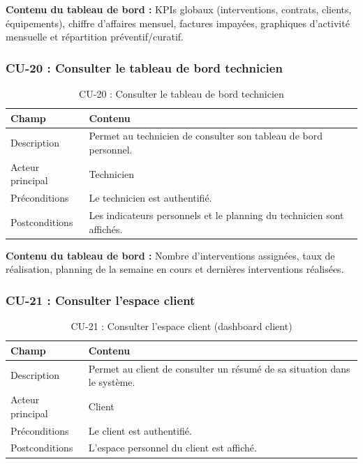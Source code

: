 \textbf{Contenu du tableau de bord :} KPIs globaux (interventions, contrats, clients, équipements), chiffre d'affaires mensuel, factures impayées, graphiques d'activité mensuelle et répartition préventif/curatif.

\subsubsection{CU-20 : Consulter le tableau de bord technicien}

\begin{table}[H]
\centering
\caption{CU-20 : Consulter le tableau de bord technicien}
\label{tab:ch5:cu20}
\begin{tabular}{|p{3.5cm}|p{11cm}|}
\hline
\textbf{Champ} & \textbf{Contenu} \\
\hline
Description & Permet au technicien de consulter son tableau de bord personnel. \\
\hline
Acteur principal & Technicien \\
\hline
Préconditions & Le technicien est authentifié. \\
\hline
Postconditions & Les indicateurs personnels et le planning du technicien sont affichés. \\
\hline
\end{tabular}
\end{table}

\textbf{Contenu du tableau de bord :} Nombre d'interventions assignées, taux de réalisation, planning de la semaine en cours et dernières interventions réalisées.

\subsubsection{CU-21 : Consulter l'espace client}

\begin{table}[H]
\centering
\caption{CU-21 : Consulter l'espace client (dashboard client)}
\label{tab:ch5:cu21}
\begin{tabular}{|p{3.5cm}|p{11cm}|}
\hline
\textbf{Champ} & \textbf{Contenu} \\
\hline
Description & Permet au client de consulter un résumé de sa situation dans le système. \\
\hline
Acteur principal & Client \\
\hline
Préconditions & Le client est authentifié. \\
\hline
Postconditions & L'espace personnel du client est affiché. \\
\hline
\end{tabular}
\end{table}


